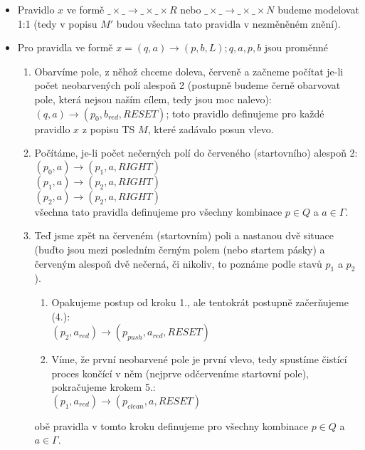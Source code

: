\documentclass[a4paper,12pt]{article} %
\begin{document}
\begin{itemize}
    \item Pravidlo $x$ ve formě $\_ \times \_ \to \_ \times \_ \times R$ nebo $\_ \times \_ \to \_ \times \_ \times N$ budeme modelovat 1:1 (tedy v popisu $M'$ budou všechna tato pravidla v nezměněném znění).
    \item Pro pravidla ve formě $x = (q, a) \to (p, b, L); q,a,p,b$ jsou proměnné
          \begin{enumerate}
              \item Obarvíme pole, z něhož chceme doleva, červeně a začneme počítat je-li počet neobarvených polí alespoň 2 (postupně budeme černě obarvovat pole, která nejsou naším cílem, tedy jsou moc nalevo): \\
                    $(q, a) \to (p_{0}, b_{red}, RESET)$; toto pravidlo definujeme pro každé pravidlo $x$ z popisu TS $M$, které zadávalo posun vlevo.
              \item Počítáme, je-li počet nečerných polí do červeného (startovního) alespoň 2:\\
                    $(p_{0}, a) \to (p_{1}, a, RIGHT)$\\
                    $(p_{1}, a) \to (p_{2}, a, RIGHT)$\\
                    $(p_{2}, a) \to (p_{2}, a, RIGHT)$\\
                    všechna tato pravidla definujeme pro všechny kombinace $p \in Q$ a $a \in \Gamma$.
              \item Teď jsme zpět na červeném (startovním) poli a nastanou dvě situace (buďto jsou mezi posledním černým polem (nebo startem pásky) a červeným alespoň dvě nečerná, či nikoliv, to poznáme podle stavů $p_1$ a $p_2$).
                    \begin{enumerate}
                        \item Opakujeme postup od kroku 1., ale tentokrát postupně začerňujeme (4.):\\
                              $(p_{2}, a_{red}) \to (p_{push}, a_{red}, RESET)$
                        \item Víme, že první neobarvené pole je první vlevo, tedy spustíme čistící proces končící v něm (nejprve odčerveníme startovní pole), pokračujeme krokem 5.:\\
                              $(p_{1}, a_{red}) \to (p_{clean}, a, RESET)$
                    \end{enumerate}
                    obě pravidla v tomto kroku definujeme pro všechny kombinace $p \in Q$ a $a \in \Gamma$.

\end{enumerate}
\end{itemize}
\end{document}
